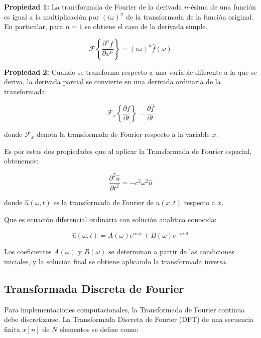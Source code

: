 \documentclass[a4paper]{article}
\begin{document}
\textbf{Propiedad 1:} La transformada de Fourier de la derivada $n$-ésima de una función es igual a la multiplicación por $(i\omega)^n$ de la transformada de la función original. En particular, para $n=1$ se obtiene el caso de la derivada simple.

\begin{equation}
    \mathcal{F}\left\{\frac{\partial^n f}{\partial x^n}\right\} = (i\omega)^n \hat{f}(\omega)
\end{equation}

\textbf{Propiedad 2:} Cuando se transforma respecto a una variable diferente a la que se deriva, la derivada parcial se convierte en una derivada ordinaria de la transformada:

\begin{equation}
    \mathcal{F}_x\left\{\frac{\partial f}{\partial t}\right\} = \frac{\partial \hat{f}}{\partial t}
\end{equation}

donde $\mathcal{F}_x$ denota la transformada de Fourier respecto a la variable $x$.

Es por estas dos propiedades que al aplicar la Transformada de Fourier espacial, obtenemos:

\begin{equation}
    \frac{\partial^2 \hat{u}}{\partial t^2} = -c^2 \omega^2 \hat{u}
\end{equation}

donde $\hat{u}(\omega, t)$ es la transformada de Fourier de $u(x,t)$ respecto a $x$.

Que es ecuación diferencial ordinaria con solución analitica conocida:

\begin{equation}
    \hat{u}(\omega, t) = A(\omega) e^{ic\omega t} + B(\omega) e^{-ic\omega t}
\end{equation}

Los coeficientes $A(\omega)$ y $B(\omega)$ se determinan a partir de las condiciones iniciales, y la solución final se obtiene
aplicando la transformada inversa.

\subsection{Transformada Discreta de Fourier}

Para implementaciones computacionales, la Transformada de Fourier continua debe discretizarse. La Transformada Discreta de Fourier
(DFT) de una secuencia finita $x[n]$ de $N$ elementos se define como:
\end{document}
